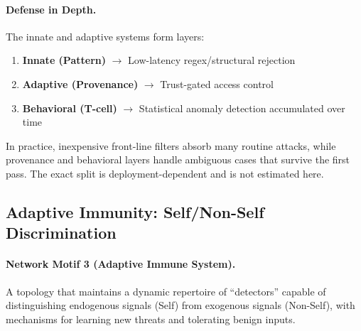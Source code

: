 \paragraph{Defense in Depth.}
The innate and adaptive systems form layers:
\begin{enumerate}[leftmargin=*]
\item \textbf{Innate (Pattern)} $\to$ Low-latency regex/structural rejection
\item \textbf{Adaptive (Provenance)} $\to$ Trust-gated access control
\item \textbf{Behavioral (T-cell)} $\to$ Statistical anomaly detection accumulated over time
\end{enumerate}
In practice, inexpensive front-line filters absorb many routine attacks, while provenance and behavioral
layers handle ambiguous cases that survive the first pass. The exact split is deployment-dependent and is
not estimated here.

\subsection{Adaptive Immunity: Self/Non-Self Discrimination}

\paragraph{Network Motif 3 (Adaptive Immune System).}
A topology that maintains a dynamic repertoire of ``detectors'' capable of distinguishing endogenous signals (Self) from exogenous signals (Non-Self), with mechanisms for learning new threats and tolerating benign inputs.

